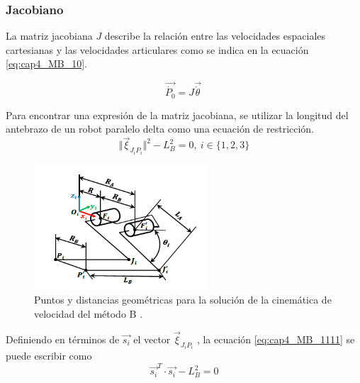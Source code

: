         \subsubsection{Jacobiano}

        La matriz jacobiana $J$ describe la relación entre las velocidades espaciales cartesianas y las velocidades articulares como se indica en la ecuación \ref{eq:cap4_MB_10}.

        \begin{equation} 
            \overrightarrow{\dot{P_{0}}}=J\overrightarrow{\dot{ \theta }}~ 
            \label{eq:cap4_MB_10}
        \end{equation}  
   
        Para encontrar una expresión de la matriz jacobiana, se utilizar la longitud del antebrazo de un robot paralelo delta como una ecuación de restricción.
        \begin{equation} 
            \Vert {\overrightarrow{\xi}}_{J_iP_i}\Vert^2 - L_B^2=0 , ~i \in \{1,2,3\}
            \label{eq:cap4_MB_1111}
        \end{equation}
        
            
                \begin{figure}[htb]
                 \centering
                 \includegraphics[width=0.5\linewidth]{Main/Chapter4/Images4/Metodo_B_Modelacion_Cinematica_Posicion_5.png}
                  \caption{Puntos y distancias geométricas para la solución de la cinemática de velocidad del método B \cite{Path_Planning_and_Trajectory_Optimization}.}
                  \label{f:Cap4_Metodo_B_Modelacion_Cinematica_Posicion_5}
            \end{figure}  
        
                    \newpage

        
        Definiendo en términos de $\overrightarrow{s_i}$ el vector $\overrightarrow{\xi}_{J_iP_i}$ , la ecuación \ref{eq:cap4_MB_1111} se puede escribir como
        \begin{equation} 
            \overrightarrow{s_{i}}^T \cdot \overrightarrow{s_{i}} - L_{B}^{2} = 0
            \label{eq:cap4_MB_11}
        \end{equation} 

